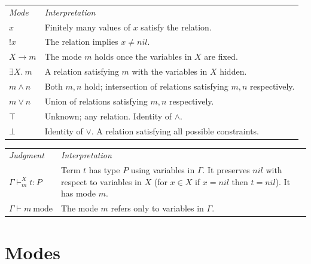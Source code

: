 \documentclass[11pt]{article}
\newcommand\name[1]{\ensuremath{\mathit{#1}}}
\newcommand\<\:                 %
\newcommand\fnspace{\<}         %
\newcommand\ex[1]{\exists{#1}.\fnspace}
\newcommand\G{\mathrm{\Gamma}}
\renewcommand\G\Gamma
\newcommand\Jmode[2]{{#1} \vdash {#2}~\text{mode}}
\newcommand\Jold[5]{{#5} \vdash^{#3}_{#4} {#1} : {#2}}
\newcommand\cJ[3]{{#1} \vdash {#2} : {#3}}
\newcommand\nil{\name{nil}}
\newcommand\mstrict[1]{\ensuremath{{!{#1}}}}
\newcommand\many\top
\newcommand\mnone\bot
\newcommand\mand\wedge
\newcommand\mplus\vee
\newcommand\mto\to              %
\newcommand\mex[1]{\ex{#1}}
\begin{document}
\noindent%
\begin{tabular}{lp{12cm}}
  \em Mode & \em Interpretation \\
  $x$ & Finitely many values of $x$ satisfy the relation.
  \\
  $\mstrict x$ & The relation implies $x \ne \nil$.
  \\
  $X \mto m$ &
  The mode $m$ holds once the variables in $X$ are fixed.
  \\
  $\mex X m$ &
  A relation satisfying $m$ with the variables in $X$ hidden.
  \\
  $m \mand n$ & Both $m, n$ hold; intersection of relations satisfying $m,n$ respectively.\\
  $m \mplus n$ &
  Union of relations satisfying $m,n$ respectively.
  \\
  $\many$ & Unknown; any relation. Identity of ${\mand}$.\\
  $\mnone$ & Identity of ${\mplus}$. A relation satisfying all possible constraints.
\end{tabular}

\noindent%
\begin{tabular}{lp{108mm}}
  \em Judgment & \em Interpretation\\
  $\Jold t P X m \G$ & Term $t$ has type $P$ using variables in $\G$.
  It preserves $\nil$ with respect to variables in $X$
  (for $x \in X$ if $x = \nil$ then $t = \nil$).
  It has mode $m$.
  \\
  $\Jmode \G m$ &
  The mode $m$ refers only to variables in $\G$.
\end{tabular}


\section{Modes}
\end{document}

